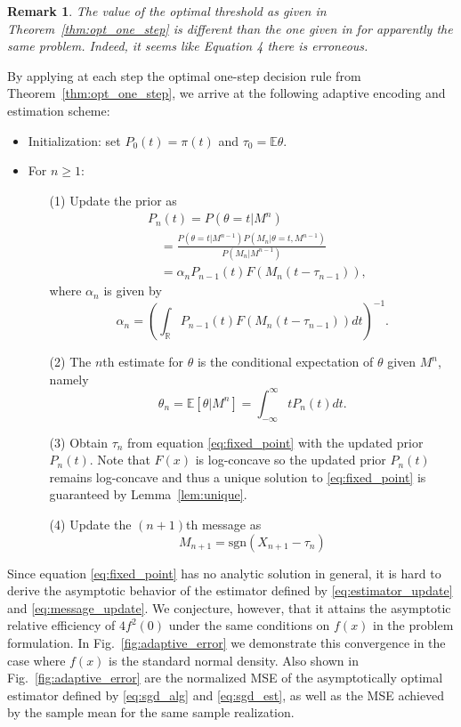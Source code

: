 \documentclass[letterpaper, conference, 11pt]{IEEEtran}      %
\newtheorem{rem}{\bf {Remark}}
\newcommand{\sgn}{\mathrm{sgn} }
\begin{document}
\begin{rem}
The value of the optimal threshold as given in Theorem~\ref{thm:opt_one_step} is different than the one given in \cite[Eq. 5]{1619423} for apparently the same problem. Indeed, it seems like Equation 4 there is erroneous. 
\end{rem}

By applying at each step the optimal one-step decision rule from Theorem~\ref{thm:opt_one_step},  we arrive at the following adaptive encoding and estimation scheme: 
\begin{itemize}
\item Initialization: set $P_0(t) = \pi(t)$ and $\tau_0 = \mathbb E \theta$. 
\item For $n\geq 1$:
\begin{enumerate}
\item[(1)] Update the prior as
\begin{align}
& P_n(t) = P(\theta=t |M^n) \nonumber \\
& \quad = \frac{ P\left( \theta=t | M^{n-1} \right) P(M_n | \theta = t , M^{n-1})  } { P(M_n | M^{n-1} )} \nonumber \\ 
& \quad = \alpha_n  P_{n-1}(t) F\left(M_n (t - \tau_{n-1}) \right), \label{eq:density_update}
\end{align}
where $\alpha_n$ is given by
\[
\alpha_n = \left(\int_{\mathbb R} P_{n-1}(t) F \left(M_n (t- \tau_{n-1}) \right)  dt \right)^{-1}. 
\]
\item[(2)] The $n$th estimate for $\theta$ is the conditional expectation of $\theta$ given $M^n$, namely
\begin{equation}
\theta_n = \mathbb E \left[ \theta| M^n\right] = \int_{-\infty}^\infty t P_n(t) dt. \label{eq:estimator_update}
\end{equation}
\item[(3)] Obtain $\tau_n$ from equation \eqref{eq:fixed_point} with the updated prior $P_n(t)$. Note that $F(x)$ is log-concave so the updated prior $P_n(t)$ remains log-concave and thus a unique solution to \eqref{eq:fixed_point} is guaranteed by Lemma~\ref{lem:unique}. 
\item[(4)] Update the $(n+1)$th message as
\begin{equation}\label{eq:message_update}
M_{n+1} = \sgn(X_{n+1}-\tau_n)
\end{equation}
\end{enumerate}
\end{itemize}
Since equation \eqref{eq:fixed_point} has no analytic solution in general, it is hard to derive the asymptotic behavior of the estimator defined by \eqref{eq:estimator_update} and \eqref{eq:message_update}. We conjecture, however, that it attains the asymptotic relative efficiency of $4f^2(0)$ under the same conditions on $f(x)$ in the problem formulation. 
In Fig.~\ref{fig:adaptive_error} we demonstrate this convergence in the case where $f(x)$ is the standard normal density. Also shown in Fig.~\ref{fig:adaptive_error} are the normalized MSE of the asymptotically optimal estimator defined by \eqref{eq:sgd_alg} and \eqref{eq:sgd_est}, as well as the MSE achieved by the sample mean for the same sample realization. 
\end{document}
